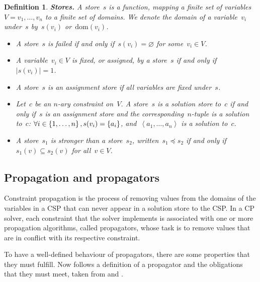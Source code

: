\documentclass[a4paper,11pt]{article}
\newtheorem{definition}{Definition}
\newcommand{\Dom}[1]{\text{dom}({#1})}
\numberwithin{equation}{section}
\begin{document}
\begin{definition}
  \textbf{Stores.} A \emph{store}~$s$ is a function, mapping a finite set of
  variables~$V = v_1, \ldots, v_n$ to a finite set of domains. We denote the domain of
  a variable~$v_i$ under~$s$ by~$s(v_i)$ or~$\Dom{v_i}$.
  \begin{itemize}
    \item A store~$s$ is \emph{failed} if and only if~$s(v_i) = \varnothing$ for some~$v_i \in V$.
    \item   A variable~$v_i \in V$ is \emph{fixed}, or \emph{assigned},
      by a store~$s$ if and only if~$|s(v_i)| = 1$. 
    \item A store~$s$ is an \emph{assignment} store if all variables are 
      fixed under~$s$.

    \item Let~$c$ be an $n$-ary constraint on~$V$. A store~$s$ is 
      a \emph{solution store} 
      to~$c$ if and only if~$s$ is an assignment store and the
      corresponding~$n$-tuple is a solution to~$c$:
      $\forall i \in \left\{1,\ldots,n\right\}, s(v_i) = \left\{a_i\right\}$,
      and~$\left<a_1,\ldots,a_n\right>$ is a solution to~$c$.

    \item A store~$s_1$ is \emph{stronger} than a store~$s_2$, 
      written~$s_1 \preceq s_2$ if and only if~$s_1(v) \subseteq s_2(v)$ 
      for all~$v \in V$.
  \end{itemize}

\end{definition}

\subsection{Propagation and propagators}

Constraint propagation is the process of removing values from the domains
of the variables in a CSP that can never appear in a solution store to the 
CSP. In a CP solver, each constraint that the solver implements is associated with 
one or more propagation algorithms, called propagators, whose task is to remove
values that are in conflict with its respective constraint.

To have a well-defined behaviour of propagators, there are some properties that
they must fulfill. Now follows a definition of a propagator and the obligations
that they must meet, taken from \cite{SchulteCarlsson:FDsys} and \cite{Gecode:MPG}.
\end{document}
